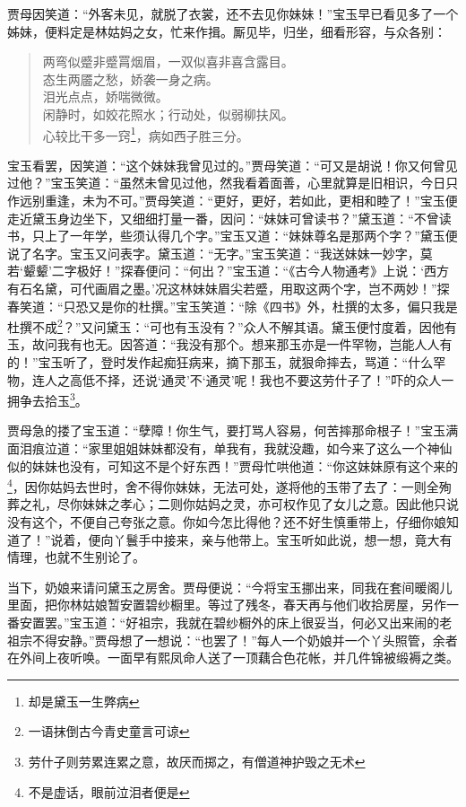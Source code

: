 \documentclass[12pt,oneside]{book}
\newenvironment{shici}{%
\begin{verse}%
\centering\large\hspace{12pt}}%
{\end{verse}}
\begin{document}
贾母因笑道：“外客未见，就脱了衣裳，还不去见你妹妹！”宝玉早已看见多了一个姊妹，便料定是林姑妈之女，忙来作揖。厮见毕，归坐，细看形容，与众各别：

\begin{shici}
两弯似蹙非蹙罥烟眉，一双似喜非喜含露目。\\
态生两靥之愁，娇袭一身之病。\\
泪光点点，娇喘微微。\\
闲静时，如姣花照水；行动处，似弱柳扶风。\\
心较比干多一窍\footnote{却是黛玉一生弊病}，病如西子胜三分。
\end{shici}

宝玉看罢，因笑道：“这个妹妹我曾见过的。”贾母笑道：“可又是胡说！你又何曾见过他？”宝玉笑道：“虽然未曾见过他，然我看着面善，心里就算是旧相识，今日只作远别重逢，未为不可。”贾母笑道：“更好，更好，若如此，更相和睦了！”宝玉便走近黛玉身边坐下，又细细打量一番，因问：“妹妹可曾读书？”黛玉道：“不曾读书，只上了一年学，些须认得几个字。”宝玉又道：“妹妹尊名是那两个字？”黛玉便说了名字。宝玉又问表字。黛玉道：“无字。”宝玉笑道：“我送妹妹一妙字，莫若‘颦颦’二字极好！”探春便问：“何出？”宝玉道：“《古今人物通考》上说：‘西方有石名黛，可代画眉之墨。’况这林妹妹眉尖若蹙，用取这两个字，岂不两妙！”探春笑道：“只恐又是你的杜撰。”宝玉笑道：“除《四书》外，杜撰的太多，偏只我是杜撰不成\footnote{一语抹倒古今青史童言可谅}？”又问黛玉：“可也有玉没有？”众人不解其语。黛玉便忖度着，因他有玉，故问我有也无。因答道：“我没有那个。想来那玉亦是一件罕物，岂能人人有的！”宝玉听了，登时发作起痴狂病来，摘下那玉，就狠命摔去，骂道：“什么罕物，连人之高低不择，还说‘通灵’不‘通灵’呢！我也不要这劳什子了！”吓的众人一拥争去拾玉\footnote{劳什子则劳累连累之意，故厌而掷之，有僧道神护毁之无术}。

贾母急的搂了宝玉道：“孽障！你生气，要打骂人容易，何苦摔那命根子！”宝玉满面泪痕泣道：“家里姐姐妹妹都没有，单我有，我就没趣，如今来了这么一个神仙似的妹妹也没有，可知这不是个好东西！”贾母忙哄他道：“你这妹妹原有这个来的\footnote{不是虚话，眼前泣泪者便是}，因你姑妈去世时，舍不得你妹妹，无法可处，遂将他的玉带了去了：一则全殉葬之礼，尽你妹妹之孝心；二则你姑妈之灵，亦可权作见了女儿之意。因此他只说没有这个，不便自己夸张之意。你如今怎比得他？还不好生慎重带上，仔细你娘知道了！”说着，便向丫鬟手中接来，亲与他带上。宝玉听如此说，想一想，竟大有情理，也就不生别论了。

当下，奶娘来请问黛玉之房舍。贾母便说：“今将宝玉挪出来，同我在套间暖阁儿里面，把你林姑娘暂安置碧纱橱里。等过了残冬，春天再与他们收拾房屋，另作一番安置罢。”宝玉道：“好祖宗，我就在碧纱橱外的床上很妥当，何必又出来闹的老祖宗不得安静。”贾母想了一想说：“也罢了！”每人一个奶娘并一个丫头照管，余者在外间上夜听唤。一面早有熙凤命人送了一顶藕合色花帐，并几件锦被缎褥之类。
\end{document}
